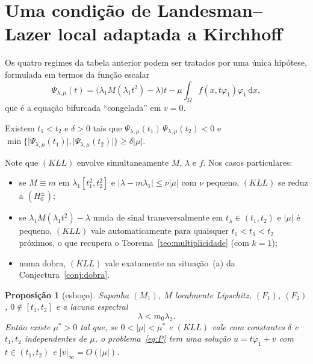 \documentclass[11pt,a4paper]{article}
\theoremstyle{plain}
\newtheorem{proposicao}[teorema]{Proposição}
\theoremstyle{definition}
\theoremstyle{remark}
\newcommand{\abs}[1]{\lvert #1\rvert}
\newcommand{\dx}{\,\mathrm{d}x}
\begin{document}
\section{Uma condição de Landesman--Lazer local adaptada a Kirchhoff}\label{sec:LL-kirchhoff}

Os quatro regimes da tabela anterior podem ser tratados por uma única hipótese,
formulada em termos da função escalar
\begin{equation}\label{eq:Psi}
\Psi_{\lambda,\mu}(t)=\bigl(\lambda_1M(\lambda_1t^2)-\lambda\bigr)t-\mu\int_\Omega f(x,t\varphi_1)\varphi_1\dx ,
\end{equation}
que é a equação bifurcada ``congelada'' em $v=0$.

\begin{description}[leftmargin=2.6em,style=nextline]
\item[$(KLL)$] Existem $t_1<t_2$ e $\delta>0$ tais que
$\Psi_{\lambda,\mu}(t_1)\,\Psi_{\lambda,\mu}(t_2)<0$ e
$\min\{\abs{\Psi_{\lambda,\mu}(t_1)},\abs{\Psi_{\lambda,\mu}(t_2)}\}\ge\delta\abs{\mu}$.
\end{description}

Note que $(KLL)$ envolve simultaneamente $M$, $\lambda$ e $f$. Nos casos
particulares:
\begin{itemize}[nosep]
\item se $M\equiv m$ em $\lambda_1[t_1^2,t_2^2]$ e $\abs{\lambda-m\lambda_1}\le\nu\abs{\mu}$
com $\nu$ pequeno, $(KLL)$ se reduz a $(H_0^\pm)$;
\item se $\lambda_1M(\lambda_1t^2)-\lambda$ muda de sinal transversalmente em
$t_\lambda\in(t_1,t_2)$ e $\abs{\mu}$ é pequeno, $(KLL)$ vale automaticamente
para quaisquer $t_1<t_\lambda<t_2$ próximos, o que recupera o
Teorema~\ref{teo:multiplicidade} (com $k=1$);
\item numa dobra, $(KLL)$ vale exatamente na situação~(a) da
Conjectura~\ref{conj:dobra}.
\end{itemize}

\begin{proposicao}[esboço]\label{prop:KLL}
Suponha $(M_1)$, $M$ localmente Lipschitz, $(F_1)$, $(F_2)$, $0\notin[t_1,t_2]$
e a lacuna espectral
\begin{equation}\label{eq:lacuna}
\lambda<m_0\lambda_2 .
\end{equation}
Então existe $\mu^*>0$ tal que, se $0<\abs{\mu}<\mu^*$ e $(KLL)$ vale com
constantes $\delta$ e $t_1,t_2$ independentes de $\mu$, o problema~\eqref{eq:P}
tem uma solução $u=t\varphi_1+v$ com $t\in(t_1,t_2)$ e $\abs{v}_\infty=O(\abs{\mu})$.
\end{proposicao}
\end{document}
